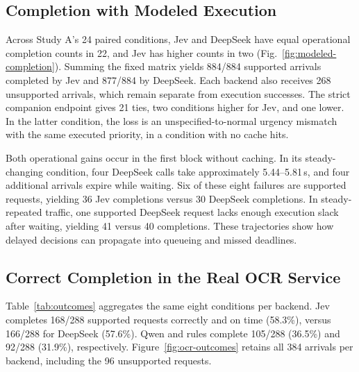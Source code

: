 \subsection{Completion with Modeled Execution}

Across Study A's 24 paired conditions, Jev and DeepSeek have equal operational
completion counts in 22, and Jev has higher counts in two
(Fig.~\ref{fig:modeled-completion}). Summing the fixed matrix yields 884/884 supported
arrivals completed by Jev and 877/884 by DeepSeek. Each backend also receives
268 unsupported arrivals, which remain separate from execution successes.
The strict companion endpoint gives 21 ties, two conditions higher for Jev,
and one lower. In the latter condition, the loss is an unspecified-to-normal
urgency mismatch with the same executed priority, in a condition with no
cache hits.



Both operational gains occur in the first block without caching. In its
steady-changing condition, four DeepSeek calls take approximately
5.44--5.81\,s, and four additional arrivals expire while waiting. Six of
these eight failures are supported requests, yielding 36 Jev completions
versus 30 DeepSeek completions. In steady-repeated traffic, one supported
DeepSeek request lacks enough execution slack after waiting, yielding 41
versus 40 completions. These trajectories show how delayed decisions can
propagate into queueing and missed deadlines.

\subsection{Correct Completion in the Real OCR Service}

Table~\ref{tab:outcomes} aggregates the same eight conditions per backend.
Jev completes 168/288 supported requests correctly and on time (58.3\%),
versus 166/288 for DeepSeek (57.6\%). Qwen and rules complete 105/288 (36.5\%)
and 92/288 (31.9\%), respectively. Figure~\ref{fig:ocr-outcomes} retains all 384
arrivals per backend, including the 96 unsupported requests.

\begin{table}[t]
\caption{Study B: aggregate outcomes over eight conditions per backend.
Completed OCR and correctly rejected requests have different denominators.
False admissions count unsupported requests actually dispatched to OCR.}
\label{tab:outcomes}
\centering

\end{table}

